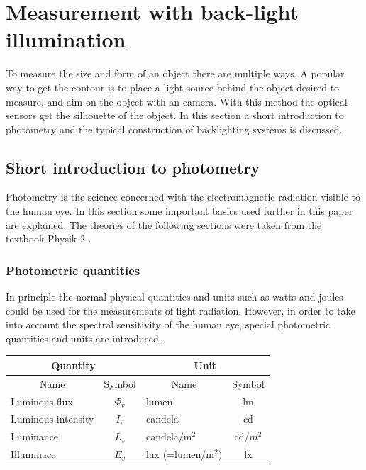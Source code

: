 \section{Measurement with back-light illumination}
To measure the size and form of an object there are multiple ways. A popular way to get the contour is to place a light source behind the object desired to measure, and aim on the object with an camera. With this method the optical sensors get the silhouette of the object. In this section a short introduction to photometry and the typical construction of backlighting systems is discussed.
\subsection{Short introduction to photometry}
Photometry is the science concerned with the electromagnetic radiation visible to the human eye. In this section some important basics used further in this paper are explained. The theories of the following sections were taken from the textbook Physik 2 \cite{ruh}.
\subsubsection{Photometric quantities}
In principle the normal physical quantities and units such as watts and joules could be used for the measurements of light radiation. However, in order to take into account the spectral sensitivity of the human eye, special photometric quantities and units are introduced.\\

\begin{table}[ht]
\centering
\begin{tabular}{ |p{6cm} p{2cm}|p{6cm} p{2cm}|  }
	\hline
	\multicolumn{2}{|c}{Quantity}&\multicolumn{2}{|c|}{Unit} \\
	\hline\hline
	\multicolumn{1}{|c}{Name}			& \multicolumn{1}{|c|}{Symbol}	& \multicolumn{1}{c}{Name}	& \multicolumn{1}{|c|}{Symbol}	\\

	\hline
	Luminous flux		& \multicolumn{1}{|c|}{$\Phi_v$}	& lumen		& \multicolumn{1}{|c|}{lm}\\
	Luminous intensity 	& \multicolumn{1}{|c|}{$I_v$} 		& candela	& \multicolumn{1}{|c|}{cd}\\
	Luminance			& \multicolumn{1}{|c|}{$L_v$}		& candela/$\text{m}^2$	& \multicolumn{1}{|c|}{cd/$m^2$}\\
	Illuminace 			& \multicolumn{1}{|c|}{$E_v$} 		& lux (=lumen/$\text{m}^2$) 	& \multicolumn{1}{|c|}{lx}\\

	\hline
\end{tabular}
\end{table}

